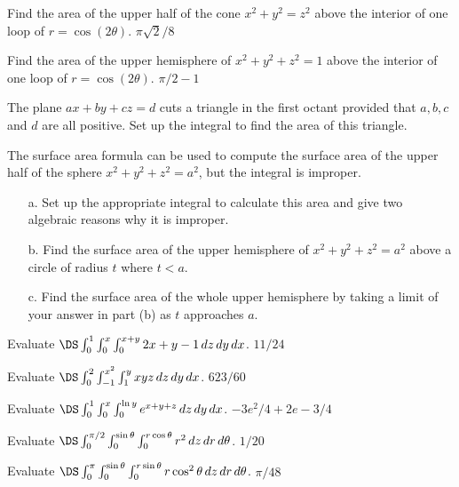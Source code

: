 \begin{multicols}{2}
\problem Find the area of the upper half of the cone %
$x^2+y^2=z^2$ above the interior of one loop of $r=\cos(2\theta)$.
\answer
$\pi\sqrt2/8$
\endanswer

\problem Find the area of the upper hemisphere of  %
$x^2+y^2+z^2=1$ above the interior of one loop of $r=\cos(2\theta)$.
\answer
$\pi/2-1$
\endanswer

\problem The plane $ax+by+cz=d$ cuts a triangle in the first octant %
provided that $a, b, c$ and $d$ are all positive.  Set up the
integral to find the area of this triangle.

\problem The surface area formula can be used to compute the surface area %
of the upper half of the sphere $x^2+y^2+z^2=a^2$, but the integral
is improper.

\begin{itemize}

\item[a.] Set up the appropriate integral to calculate this area and give
    two algebraic reasons why it is improper.


    \item[b.] Find the surface area of the upper hemisphere of
        $x^2+y^2+z^2=a^2$ above a circle of radius $t$ where $t<a$.

    \item[c.] Find the surface area of the whole upper hemisphere by taking a
        limit of your answer in part (b) as $t$ approaches $a$.

    \end{itemize}





    \problem Evaluate $\DS\int_{0}^{1}\int_{0}^{x}\int_{0}^{x+y}
    2x+y-1 \,dz\,dy\,dx$.
    \answer
    $11/24$
\endanswer

\problem Evaluate $\DS\int_{0}^{2}\int_{-1}^{x^2}\int_{1}^{y} %
xyz \,dz\,dy\,dx$.
\answer
$623/60$
\endanswer

\problem Evaluate $\DS\int_{0}^{1}\int_{0}^{x}\int_{0}^{\ln y} %
e^{x+y+z}\,dz\,dy\,dx$.
\answer
$-3e^2/4+2e-3/4$
\endanswer

\problem Evaluate %
$\DS\int_{0}^{\pi/2}\int_{0}^{\sin\theta}\int_{0}^{r\cos\theta}
r^2\,dz\,dr\,d\theta$.
\answer
$1/20$
\endanswer

\problem Evaluate  %
$\DS\int_{0}^{\pi}\int_{0}^{\sin\theta}\int_{0}^{r\sin\theta}
r\cos^2\theta\,dz\,dr\,d\theta$.
\answer
$\pi/48$
\endanswer


\end{multicols}
